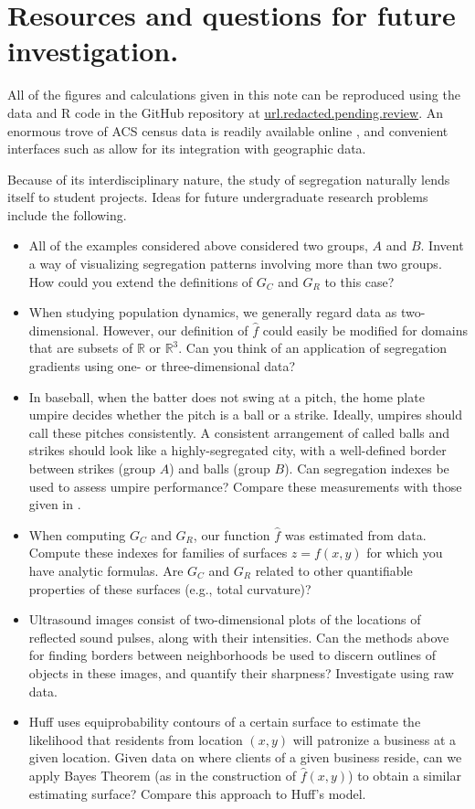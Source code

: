 \documentclass{article}
\theoremstyle{theorem}
\theoremstyle{definition}
\begin{document}
\section{Resources and questions for future investigation.}

All of the figures and calculations given in this note can be reproduced using the data and R code in the GitHub repository at
\url{url.redacted.pending.review}. An enormous trove of ACS census data is readily available online \cite{acs19}, and convenient interfaces such as \cite{walker19} allow for its integration with geographic data.

Because of its interdisciplinary nature, the study of segregation naturally lends itself to student projects. Ideas for future undergraduate research problems include the following.

\begin{itemize}
  \item All of the examples considered above considered two groups, $A$ and $B$. Invent a way of visualizing segregation patterns involving more than two groups. How could you extend the definitions of $G_C$ and $G_R$ to this case?
  \item When studying population dynamics, we generally regard data as two-dimensional. However, our definition of $\hat{f}$ could easily be modified for domains that are subsets of $\mathbb{R}$ or $\mathbb{R}^3$.  Can you think of an application of segregation gradients using one- or three-dimensional data?
  \item In baseball, when the batter does not swing at a pitch, the home plate umpire decides whether the pitch is a ball or a strike. Ideally, umpires should call these pitches consistently. A consistent arrangement of called balls and strikes should look like a highly-segregated city, with a well-defined border between strikes (group $A$) and balls (group $B$). Can segregation indexes be used to assess umpire performance? Compare these measurements with those given in \cite{hunter18}.
  \item When computing $G_C$ and $G_R$, our function $\hat{f}$ was estimated from data. Compute these indexes for families of surfaces $z = f(x,y)$ for which you have analytic formulas. Are $G_C$ and $G_R$ related to other quantifiable properties of these surfaces (e.g., total curvature)?
  \item Ultrasound images consist of two-dimensional plots of the locations of reflected sound pulses, along with their intensities. Can the methods above for finding borders between neighborhoods be used to discern outlines of objects in these images, and quantify their sharpness? Investigate using raw data.
  \item Huff \cite{huff63} uses equiprobability contours of a certain surface to estimate the likelihood that residents from location $(x,y)$ will patronize a business at a given location. Given data on where clients of a given business reside, can we apply Bayes Theorem (as in the construction of $\hat{f}(x,y)$) to obtain a similar estimating surface? Compare this approach to Huff's model.
\end{itemize}
\end{document}

